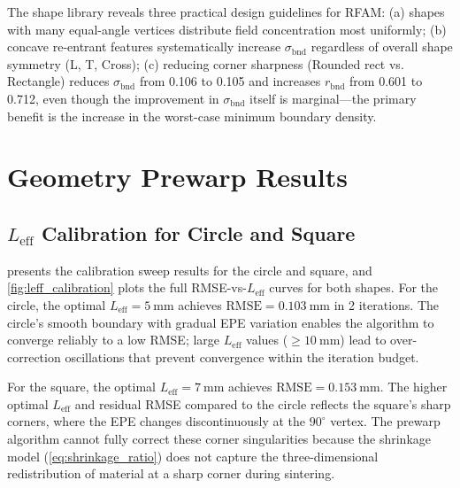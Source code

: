 \documentclass[5p,times]{elsarticle}
\newcommand{\bndstd}{\sigma_{\mathrm{bnd}}}
\newcommand{\Leff}{L_{\mathrm{eff}}}
\newcommand{\RMSE}{\mathrm{RMSE}}
\begin{document}
The shape library reveals three practical design guidelines for RFAM:
(a) shapes with many equal-angle vertices distribute field concentration
most uniformly;
(b) concave re-entrant features systematically increase $\bndstd$
regardless of overall shape symmetry (L, T, Cross);
(c) reducing corner sharpness (Rounded rect vs. Rectangle) reduces
$\bndstd$ from 0.106 to 0.105 and increases $r_{\mathrm{bnd}}$ from
0.601 to 0.712, even though the improvement in $\bndstd$ itself is
marginal---the primary benefit is the increase in the worst-case
minimum boundary density.

\FloatBarrier
\section{Geometry Prewarp Results}
\label{sec:results_prewarp}

\subsection{$\Leff$ Calibration for Circle and Square}

 presents the calibration sweep results
for the circle and square, and \cref{fig:leff_calibration} plots
the full RMSE-vs-$\Leff$ curves for both shapes.  For the circle,
the optimal $\Leff = \SI{5}{\milli\meter}$ achieves
$\RMSE = \SI{0.103}{\milli\meter}$ in 2 iterations.  The circle's
smooth boundary with gradual EPE variation enables the algorithm to
converge reliably to a low RMSE; large $\Leff$ values
($\geq \SI{10}{\milli\meter}$) lead to over-correction oscillations
that prevent convergence within the iteration budget.

For the square, the optimal $\Leff = \SI{7}{\milli\meter}$ achieves
$\RMSE = \SI{0.153}{\milli\meter}$.  The higher optimal $\Leff$ and
residual RMSE compared to the circle reflects the square's sharp corners,
where the EPE changes discontinuously at the $90^\circ$ vertex.  The
prewarp algorithm cannot fully correct these corner singularities
because the shrinkage model (\cref{eq:shrinkage_ratio}) does not capture
the three-dimensional redistribution of material at a sharp corner during
sintering.
\end{document}
